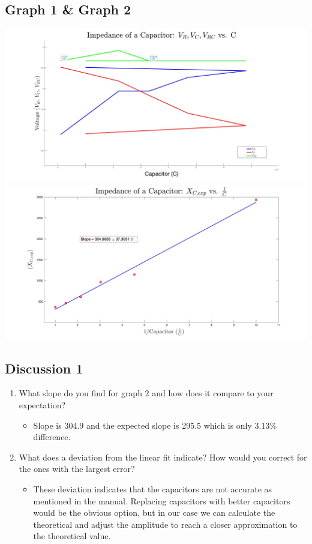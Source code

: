 \documentclass{article}
\begin{document}
\begin{table}[!htp]
\begin{center}
    \subsection*{Graph 1 \& Graph 2}
    \includegraphics[scale=0.13]{graph1.jpg}
    \includegraphics[scale=0.13]{graph2.jpg}
    \subsection*{Discussion 1}
    \begin{enumerate}
      \item What slope do you find for graph 2 and how does it compare to your expectation?
      \begin{itemize}
        \item Slope is 304.9 and the expected slope is 295.5 which is only 3.13\% difference.
      \end{itemize}
      \item What does a deviation from the linear fit indicate? How would you correct for the ones with the largest error?
      \begin{itemize}
        \item These deviation indicates that the capacitors are not accurate as mentioned in the manual. Replacing capacitors with better capacitors would be the obvious option, but in our case we can calculate the theoretical and adjust the amplitude to reach a closer approximation to the theoretical value.
      \end{itemize}
    \end{enumerate}
  \end{center}
\end{table}
\end{document}
